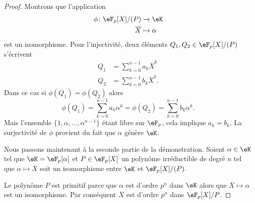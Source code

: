 \begin{proof}
	Montrons que l'application
	\begin{equation}
		\begin{aligned}
			\phi\colon \eF_p[X]/(P) & \to \eK        \\
			\overline        X      & \mapsto \alpha
		\end{aligned}
	\end{equation}
	est un isomorphisme. Pour l'injectivité, deux éléments \( Q_1,Q_2\in \eF_p[X]/(P)\) s'écrivent
	\begin{subequations}
		\begin{align}
			Q_1 & =\sum_{k=0}^{n-1}a_k\overline X^k  \\
			Q_2 & =\sum_{k=0}^{n-1}b_k\overline X^k.
		\end{align}
	\end{subequations}
	Dans ce cas si \( \phi(Q_1)=\phi(Q_2)\) alors
	\begin{equation}
		\phi(Q_1)=\sum_{k=0}^{n-1}a_k\alpha^k=\phi(Q_2)=\sum_{k=0}^{n-1}b_k\alpha^k.
	\end{equation}
	Mais l'ensemble \( \{ 1,\alpha,\ldots, \alpha^{n-1} \}\) étant libre sur \( \eF_p\), cela implique \( a_k=b_k\). La surjectivité de \( \phi\) provient du fait que \( \alpha\) génère \( \eK\).

	Nous passons maintenant à la seconde partie de la démonstration. Soient \( \alpha\in \eK\) tel que \( \eK=\eF_p[\alpha]\) et \( P\in \eF_p[X]\) un polynôme irréductible de degré \( n\) tel que \( \alpha\mapsto \overline X\) soit un isomorphisme entre \( \eK\) et \( \eF_p[X]/(P)\).

	Le polynôme \( P\) est primitif parce que \( \alpha\) est d'ordre \( p^n\) dans \( \eK\) alors que \( \overline X\mapsto \alpha\) est un isomorphisme. Par conséquent \( \overline X\) est d'ordre \( p^n\) dans \( \eF_p[X]/P\).


\end{proof}
